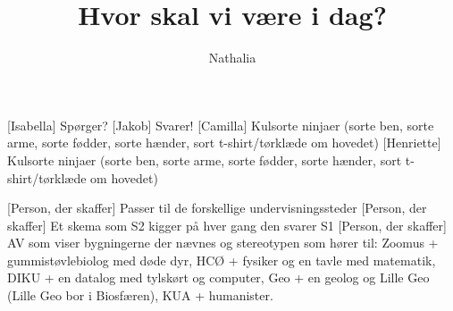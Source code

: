 \documentclass[a4paper,11pt]{article}
\title{Hvor skal vi være i dag?}
\author{Nathalia}
\begin{document}
\maketitle

\begin{roles}
    [Isabella] Spørger?
    [Jakob] Svarer!
    [Camilla] Kulsorte ninjaer (sorte ben, sorte arme, sorte fødder, sorte hænder, sort t-shirt/tørklæde om hovedet)
    [Henriette] Kulsorte ninjaer (sorte ben, sorte arme, sorte fødder, sorte hænder, sort t-shirt/tørklæde om hovedet)

\end{roles}

\begin{props}
    [Person, der skaffer] Passer til de forskellige undervisningssteder
    [Person, der skaffer] Et skema som S2 kigger på hver gang den svarer S1
    [Person, der skaffer] AV som viser bygningerne der nævnes og stereotypen som hører til: Zoomus + gummistøvlebiolog med døde dyr, HCØ + fysiker og en tavle med matematik, DIKU + en datalog med tylskørt og computer, Geo + en geolog og Lille Geo (Lille Geo bor i Biosfæren), KUA + humanister.

\end{props}
\end{document}
